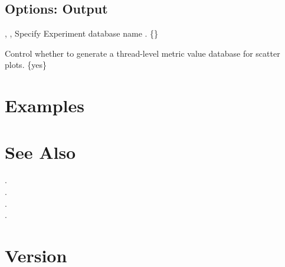 \documentclass[english]{article}
\begin{document}
\subsection{Options: Output}

\begin{Description}

\item[\OptArg{-o}{db-path}, \OptArg{--db}{db-path}, \OptArg{--output}{db-path}]
Specify Experiment database name .
\{\}

\item[\OptArg{--metric-db}{yes|no}]
Control whether to generate a thread-level metric value database for  scatter plots.
\{yes\}

\end{Description}


\section{Examples}






\section{See Also}

.\\
.\\
.\\
.

\section{Version}
\end{document}
